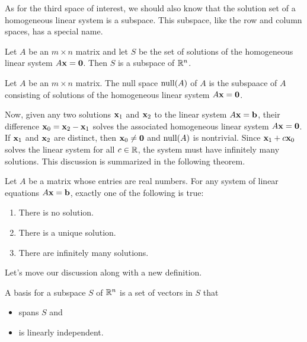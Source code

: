 \documentclass[../m73main.tex]{subfiles}
\begin{document}
As for the third space of interest, we should also know that the solution set of a homogeneous linear system is a subspace.
This subspace, like the row and column spaces, has a special name.

\begin{theorem}
	Let $A$ be an $m\times n$ matrix and let $S$ be the set of solutions of the homogeneous linear system $A\mathbf{x} = \mathbf{0}$.
	Then $S$ is a subspace of $\mathbb{R}^n$.
\end{theorem}

\begin{definition}
	Let $A$ be an $m\times n$ matrix.
	The null space $\textrm{null}(A)$ of $A$ is the subspaace of $A$ consisting of solutions of the homogeneous linear system $A\mathbf{x} = \mathbf{0}$.
\end{definition}

Now, given any two solutions $\mathbf{x}_1$ and $\mathbf{x}_2$ to the linear system $A\mathbf{x} = \mathbf{b}$, their difference $\mathbf{x}_0 = \mathbf{x}_2 - \mathbf{x}_1$ solves the associated homogeneous linear system $A\mathbf{x} = \mathbf{0}$.
If $\mathbf{x}_1$ and $\mathbf{x}_2$ are distinct, then $\mathbf{x}_0 \neq \mathbf{0}$ and $\textrm{null} (A)$ is nontrivial.
Since $\mathbf{x}_1 + c\mathbf{x}_0$ solves the linear system for all $c \in \mathbb{R}$, the system must have infinitely many solutions.
This discussion is summarized in the following theorem.

\begin{theorem}
	Let $A$ be a matrix whose entries are real numbers.
	For any system of linear equations $A\mathbf{x} = \mathbf{b}$, exactly one of the following is true:
	\begin{enumerate}[label=(\alph*)]
		\item There is no solution.
		\item There is a unique solution.
		\item There are infinitely many solutions.
	\end{enumerate}
\end{theorem}

Let's move our discussion along with a new definition.

\begin{definition}
	A basis for a subspace $S$ of $\mathbb{R}^n$ is a set of vectors in $S$ that
	\begin{itemize}
		\item spans $S$ and
		\item is linearly independent.
	\end{itemize}
\end{definition}
\end{document}
